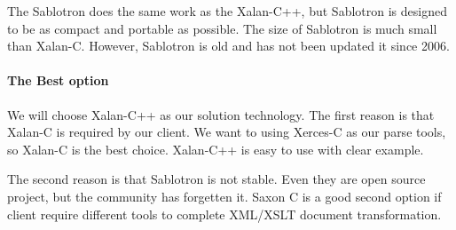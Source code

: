 The Sablotron does the same work as the Xalan-C++, but Sablotron is designed to be as compact and portable as possible.
The size of Sablotron is much small than Xalan-C.
However, Sablotron is old and has not been updated it since 2006.

\paragraph{The Best option}

We will choose Xalan-C++ as our solution technology.
The first reason is that Xalan-C is required by our client.
We want to using Xerces-C as our parse tools, so Xalan-C is the best choice.
Xalan-C++ is easy to use with clear example.

The second reason is that Sablotron is not stable.
Even they are open source project, but the community has forgetten it.
Saxon C is a good second option if client require different tools to complete XML/XSLT document transformation.
